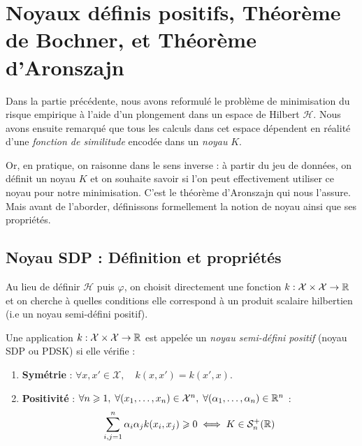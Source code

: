 
\section{Noyaux définis positifs, Théorème de Bochner, et Théorème d'Aronszajn}

Dans la partie précédente, nous avons reformulé le problème de minimisation du risque empirique à l'aide d'un plongement dans un espace de Hilbert $ \mathcal{H}$. Nous avons ensuite remarqué que tous les calculs dans cet espace dépendent en réalité d'une \emph{fonction de similitude} encodée dans un \emph{noyau} $K$. 

Or, en pratique, on raisonne dans le sens inverse : à partir du jeu de données, on définit un noyau $K$ et on souhaite savoir si l'on peut effectivement utiliser ce noyau pour notre minimisation. C'est le théorème d'Aronszajn qui nous l'assure. Mais avant de l'aborder, définissons formellement la notion de noyau ainsi que ses propriétés. 

\subsection{Noyau SDP : Définition et propriétés}

Au lieu de définir $\mathcal{H}$ puis $\varphi$, on choisit directement une fonction $k : \mathcal{X} \times \mathcal{X} \to \mathbb{R}$ et on cherche à quelles conditions elle correspond à un produit scalaire hilbertien (i.e un noyau semi-défini positif). 

\begin{definition}
    Une application $k : \mathcal{X} \times \mathcal{X} \to \mathbb{R}$ est appelée un \emph{noyau semi-défini positif} (noyau SDP ou PDSK) si elle vérifie :
    \begin{enumerate}
        \item \textbf{Symétrie} : $\forall x, x' \in \mathcal{X}, \quad k(x, x') = k(x', x)$.
        \item \textbf{Positivité} : $\forall n \geqslant 1, \; \forall (x_1, \dots, x_n) \in \mathcal{X}^n, \; \forall (\alpha_1, \dots, \alpha_n) \in \mathbb{R}^n$ :
        \begin{equation}
            \sum_{i,j=1}^n \alpha_i \alpha_j k(x_i, x_j) \geqslant 0 \iff K \in \mathcal{S}_n^+(\mathbb{R})
        \end{equation}
    \end{enumerate}
\end{definition}

